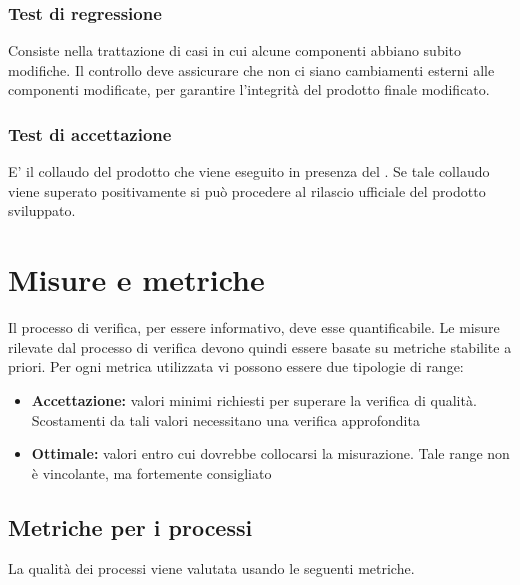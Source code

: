 \documentclass[12pt,a4paper]{article}
\begin{document}
\subsubsection{Test di regressione}
Consiste nella trattazione di casi in cui alcune componenti abbiano subito modifiche. Il controllo deve assicurare che non ci siano cambiamenti esterni alle componenti modificate, per garantire l'integrità del prodotto finale modificato.

\subsubsection{Test di accettazione}
E' il collaudo del prodotto  che viene eseguito in presenza del . Se tale collaudo viene superato positivamente si può procedere al rilascio ufficiale del prodotto sviluppato. 

\newpage
\section{Misure e metriche}\label{metriche}
Il processo di verifica, per essere informativo, deve esse quantificabile. Le misure rilevate dal processo di verifica devono quindi essere basate su metriche stabilite a priori. Per ogni metrica utilizzata vi possono essere due tipologie di range:
\begin{itemize}
	\item \textbf{Accettazione:} valori minimi richiesti per superare la verifica di qualità. Scostamenti da tali valori necessitano una verifica approfondita
	\item \textbf{Ottimale:} valori entro cui dovrebbe collocarsi la misurazione. Tale range non è vincolante, ma fortemente consigliato
\end{itemize}

\subsection{Metriche per i processi}\label{metriche_processi}
La qualità dei processi viene valutata usando le seguenti metriche.
\end{document}
